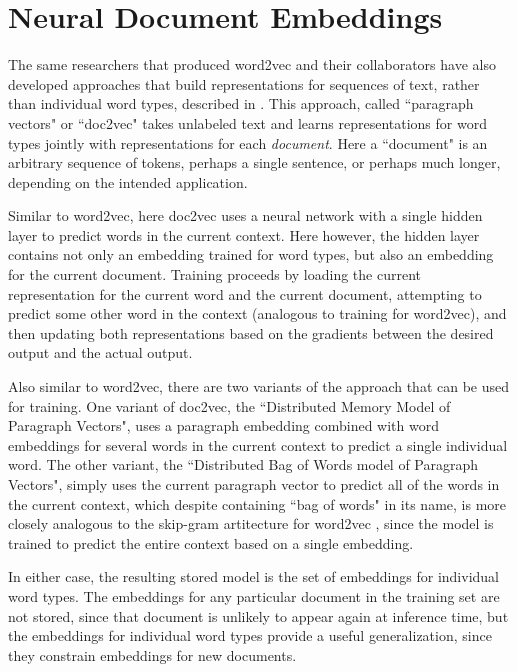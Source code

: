 

\section{Neural Document Embeddings}
The same researchers that produced word2vec and their collaborators have also
developed approaches that build representations for sequences of text, rather
than individual word types, described in
\cite{dai-document-embedding-2015,quocle-distributed-representations-2014}.
This approach, called ``paragraph vectors" or ``doc2vec" takes unlabeled text
and learns representations for word types jointly with representations for each
\emph{document}. Here a ``document" is an arbitrary sequence of tokens, perhaps
a single sentence, or perhaps much longer, depending on the intended
application.

Similar to word2vec, here doc2vec uses a neural network with a single hidden
layer to predict words in the current context. Here however, the hidden layer
contains not only an embedding trained for word types, but also an embedding
for the current document. Training proceeds by loading the current
representation for the current word and the current document, attempting to
predict some other word in the context (analogous to training for word2vec),
and then updating both representations based on the gradients between the
desired output and the actual output. 

Also similar to word2vec, there are two variants of the approach that can be
used for training. One variant of doc2vec, the ``Distributed Memory Model of
Paragraph Vectors", uses a paragraph embedding combined with word embeddings
for several words in the current context to predict a single individual word.
The other variant, the ``Distributed Bag of Words model of Paragraph Vectors",
simply uses the current paragraph vector to predict all of the words in the
current context, which despite containing ``bag of words" in its name, is more
closely analogous to the skip-gram artitecture for word2vec
\cite{quocle-distributed-representations-2014}, since the model is trained to
predict the entire context based on a single embedding.

In either case, the resulting stored model is the set of embeddings for
individual word types. The embeddings for any particular document in the
training set are not stored, since that document is unlikely to appear again at
inference time, but the embeddings for individual word types provide a useful
generalization, since they constrain embeddings for new documents.

